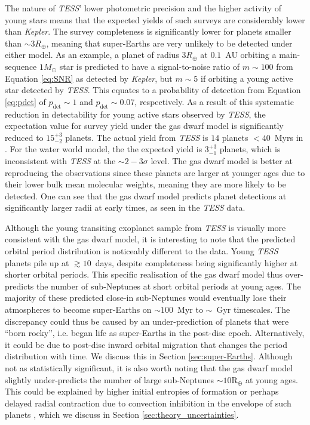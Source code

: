 \documentclass[fleqn,usenatbib]{mnras}
\begin{document}
The nature of \textit{TESS}' lower photometric precision and the higher activity of young stars means that the expected yields of such surveys are considerably lower than \textit{Kepler}. The survey completeness is significantly lower for planets smaller than $\sim 3 R_\oplus$, meaning that super-Earths are very unlikely to be detected under either model. As an example, a planet of radius $3 R_\oplus$ at $0.1$~AU orbiting a main-sequence $1 M_\odot$ star is predicted to have a signal-to-noise ratio of $m \sim 100$ from Equation \ref{eq:SNR} as detected by \textit{Kepler}, but $m \sim 5$ if orbiting a young active star detected by \textit{TESS}. This equates to a probability of detection from Equation \ref{eq:pdet} of $p_\text{det} \sim 1$ and $p_\text{det} \sim 0.07$, respectively. As a result of this systematic reduction in detectability for young active stars observed by \textit{TESS}, the expectation value for survey yield under the gas dwarf model is significantly reduced to $15^{+3}_{-2}$ planets. The actual yield from \textit{TESS} is $14$ planets $< 40$~Myrs in \citet{Vach2024a}. For the water world model, the the expected yield is $3^{+3}_{-1}$ planets, which is inconsistent with \textit{TESS} at the $\sim 2-3\sigma$ level. The gas dwarf model is better at reproducing the observations since these planets are larger at younger ages due to their lower bulk mean molecular weights, meaning they are more likely to be detected. One can see that the gas dwarf model predicts planet detections at significantly larger radii at early times, as seen in the \textit{TESS} data.

Although the young transiting exoplanet sample from \textit{TESS} is visually more consistent with the gas dwarf model, it is interesting to note that the predicted orbital period distribution is noticeably different to the data. Young \textit{TESS} planets pile up at $\gtrsim 10$~days, despite completeness being significantly higher at shorter orbital periods. This specific realisation of the gas dwarf model thus over-predicts the number of sub-Neptunes at short orbital periods at young ages. The majority of these predicted close-in sub-Neptunes would eventually lose their atmospheres to become super-Earths on $\sim 100$~Myr to $\sim$~Gyr timescales. The discrepancy could thus be caused by an under-prediction of planets that were ``born rocky'', i.e. began life as super-Earths in the post-disc epoch. Alternatively, it could be due to post-disc inward orbital migration that changes the period distribution with time. We discuss this in Section \ref{sec:super-Earths}. Although not as statistically significant, it is also worth noting that the gas dwarf model slightly under-predicts the number of large sub-Neptunes $\sim 10$R$_\oplus$ at young ages. This could be explained by higher initial entropies of formation or perhaps delayed radial contraction due to convection inhibition in the envelope of such planets \citep[e.g.][]{Misener2022}, which we discuss in Section \ref{sec:theory_uncertainties}.
\end{document}
